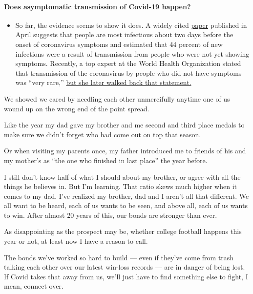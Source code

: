 \begin{itemize}
{  \paragraph{Does asymptomatic transmission of Covid-19
  happen?}\label{does-asymptomatic-transmission-of-covid-19-happen}}

  \begin{itemize}
  \tightlist
  \item
    So far, the evidence seems to show it does. A widely cited
    \href{https://www.nature.com/articles/s41591-020-0869-5}{paper}
    published in April suggests that people are most infectious about
    two days before the onset of coronavirus symptoms and estimated that
    44 percent of new infections were a result of transmission from
    people who were not yet showing symptoms. Recently, a top expert at
    the World Health Organization stated that transmission of the
    coronavirus by people who did not have symptoms was ``very rare,''
    \href{https://www.nytimes3xbfgragh.onion/2020/06/09/world/coronavirus-updates.html?action=click\&pgtype=Article\&state=default\&region=MAIN_CONTENT_3\&context=storylines_faq\#link-1f302e21}{but
    she later walked back that statement.}
  \end{itemize}
\end{itemize}

We showed we cared by needling each other unmercifully anytime one of us
wound up on the wrong end of the point spread.

Like the year my dad gave my brother and me second and third place
medals to make sure we didn't forget who had come out on top that
season.

Or when visiting my parents once, my father introduced me to friends of
his and my mother's as ``the one who finished in last place'' the year
before.

I still don't know half of what I should about my brother, or agree with
all the things he believes in. But I'm learning. That ratio skews much
higher when it comes to my dad. I've realized my brother, dad and I
aren't all that different. We all want to be heard, each of us wants to
be seen, and above all, each of us wants to win. After almost 20 years
of this, our bonds are stronger than ever.

As disappointing as the prospect may be, whether college football
happens this year or not, at least now I have a reason to call.

The bonds we've worked so hard to build --- even if they've come from
trash talking each other over our latest win-loss records --- are in
danger of being lost. If Covid takes that away from us, we'll just have
to find something else to fight, I mean, connect over.

